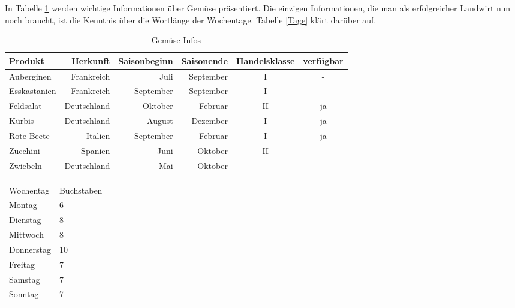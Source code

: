 \documentclass{scrartcl}
\begin{document}
In Tabelle \ref{Gemuse} werden wichtige Informationen über Gemüse präsentiert. Die einzigen Informationen, die man als erfolgreicher Landwirt nun noch braucht, ist die Kenntnis über die Wortlänge der Wochentage. Tabelle \ref{Tage} klärt darüber auf.
\begin{table}[t]
	\begin{tabular}{lrrrcc}

	\toprule
	Produkt & Herkunft & Saisonbeginn & Saisonende & Handelsklasse & verfügbar \\ \midrule
	Auberginen & Frankreich & Juli & September & I & - \\
	Esskastanien & Frankreich & September & September & I & - \\
	Feldsalat & Deutschland & Oktober & Februar & II & ja \\
	Kürbis & Deutschland & August & Dezember & I & ja \\
	Rote Beete & Italien & September & Februar & I & ja \\
	Zucchini & Spanien & Juni & Oktober & II & - \\
	Zwiebeln & Deutschland & Mai & Oktober & - & - \\
	\bottomrule

	\end{tabular}
\caption{Gemüse-Infos}
\label{Gemuse}
\end{table}

\begin{table}[h]
	\begin{tabular}{|>{\columncolor[gray]{.8}}l|
			>{\color{white}%
				\columncolor[gray]{.2}}l|
}
		Wochentag & Buchstaben\\

		Montag & 6\\
		Dienstag & 8\\
		Mittwoch & 8\\
		Donnerstag & 10\\
		Freitag & 7\\
		Samstag & 7\\
		Sonntag & 7\\
	\end{tabular}
\end{table}
\end{document}
